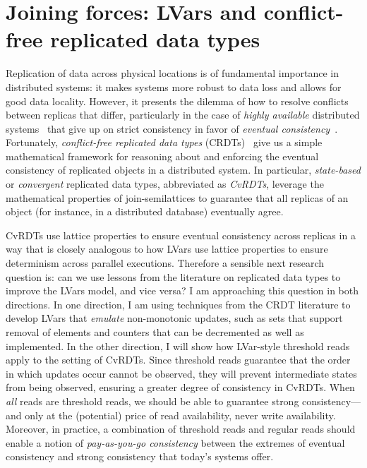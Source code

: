 \documentclass{article}
\begin{document}
\section{Joining forces: LVars and conflict-free replicated data types}\label{crdts}

Replication of data across physical locations is of fundamental
importance in distributed systems: it makes systems more robust to
data loss and allows for good data locality.  However, it presents the
dilemma of how to resolve conflicts between replicas that differ,
particularly in the case of \emph{highly available} distributed
systems~\cite{dynamo} that give up on strict consistency in favor of
\emph{eventual consistency}~\cite{vogels-ec}.  Fortunately,
\emph{conflict-free replicated data types} (CRDTs)~\cite{crdts,
  crdts-tr} give us a simple mathematical framework for reasoning
about and enforcing the eventual consistency of replicated objects in
a distributed system.  In particular, \emph{state-based} or
\emph{convergent} replicated data types, abbreviated as \emph{CvRDTs},
leverage the mathematical properties of join-semilattices to guarantee
that all replicas of an object (for instance, in a distributed
database) eventually agree.

CvRDTs use lattice properties to ensure eventual consistency across
replicas in a way that is closely analogous to how LVars use lattice
properties to ensure determinism across parallel executions.
Therefore a sensible next research question is: can we use lessons
from the literature on replicated data types to improve the LVars
model, and vice versa?  I am approaching this question in both
directions.  In one direction, I am using techniques from the CRDT
literature to develop LVars that \emph{emulate} non-monotonic updates,
such as sets that support removal of elements and counters that can be
decremented as well as implemented.  In the other direction, I will
show how LVar-style threshold reads apply to the setting of CvRDTs.
Since threshold reads guarantee that the order in which updates occur
cannot be observed, they will prevent intermediate states from being
observed, ensuring a greater degree of consistency in CvRDTs.  When
\emph{all} reads are threshold reads, we should be able to guarantee
strong consistency---and only at the (potential) price of read
availability, never write availability. Moreover, in practice, a
combination of threshold reads and regular reads should enable a
notion of \emph{pay-as-you-go consistency} between the extremes of
eventual consistency and strong consistency that today's systems
offer.


\newcommand{\myname}[0]{\textbf{Lindsey Kuper}}

\end{document}
